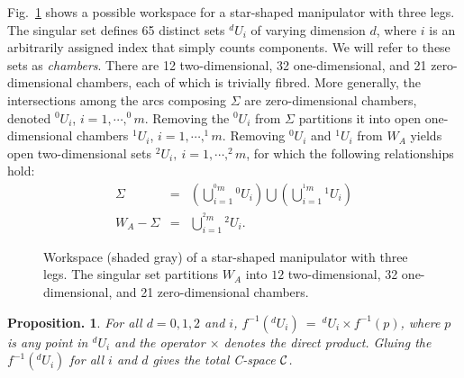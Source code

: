 \documentclass[twocolumn]{IEEEtran}
\newtheorem{Proposition}{{\bf Proposition.}}
\begin{document}
Fig.~\ref{fig:chambers} shows a possible workspace for a star-shaped
manipulator with three legs. The singular set defines 65 distinct
sets $^dU_i$ of varying dimension $d$, where $i$ is an arbitrarily
assigned index that simply counts components. We will refer to these
sets as {\sl chambers}. There are 12 two-dimensional, 32
one-dimensional, and 21 zero-dimensional chambers, each of which is
trivially fibred. More generally, the intersections among the arcs
composing $\Sigma$ are zero-dimensional chambers, denoted $^0\!U_i$,
$i=1,\cdots,^0\!m$. Removing the $^0\!U_i$ from $\Sigma$ partitions
it into open one-dimensional chambers $^1\!U_i$, $i=1,\cdots,^1\!m$.
Removing $^0\!U_i$ and $^1\!U_i$ from $W_A$ yields open
two-dimensional sets $^2\!U_i, \ i=1,\cdots,^2\!m$, for which the
following relationships hold:
\begin{eqnarray}
\Sigma & = & \left(\bigcup_{i=1}^{^0\!m} {}^0\!U_i \right) \bigcup
\left(\bigcup_{i=1}^{^1\!m} {}^1\!U_i \right) \\[5pt]
W_A - \Sigma & = & \bigcup_{i=1}^{^2\!m} {}^2\!U_i.
\end{eqnarray}
\begin{figure}
 \vbox{
      }
 \caption{Workspace (shaded gray) of a star-shaped manipulator with
 three legs. The singular set partitions $W_A$ into $12$ two-dimensional,
 32 one-dimensional, and 21 zero-dimensional chambers.}
 \label{fig:chambers}
\end{figure}

 \smallskip

\begin{Proposition}
\label{prop-01} \rm For all $d=0,1,2$ and $i$, $f^{-1}(^d\!U_i) \ =
\ ^d\!U_i \times f^{-1}(p)$, where $p$ is any point in $^d\!U_i$ and
the operator $\times$ denotes the direct product. Gluing the
$f^{-1}(^d\!U_i)$ for all $i$ and $d$ gives the total C-space ${\cal
C}$.
\end{Proposition}

\medskip

\end{document}
